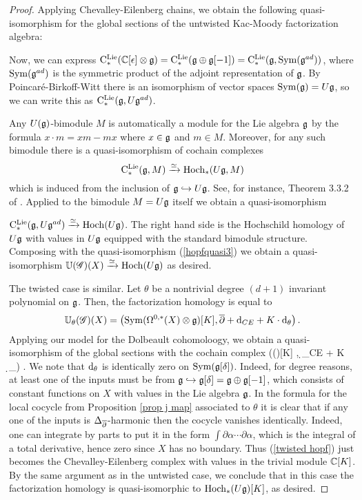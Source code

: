 \begin{proof}
Applying Chevalley-Eilenberg chains, we obtain the following quasi-isomorphism for the global sections of the untwisted Kac-Moody factorization algebra:
\beqn\label{hopfquasi3}
\eeqn
Now, we can express ${\rm C}^{\rm Lie}_*(\mathbb C[\epsilon] \otimes \mathfrak g) = {\rm C}^{\rm Lie}_*(\mathfrak g \oplus \mathfrak g[-1]) = {\rm C}^{\rm Lie}_*(\mathfrak g, {\rm Sym} (\mathfrak g^{ad}))$, where ${\rm Sym}(\mathfrak g^{ad})$ is the symmetric product of the adjoint representation of $\mathfrak g$. 
By Poincar\'{e}-Birkoff-Witt there is an isomorphism of vector spaces ${\rm Sym}(\mathfrak g) = U \mathfrak g$, so we can write this as ${\rm C}^{\rm Lie}_*(\mathfrak g, U \mathfrak g^{ad})$.

Any $U(\mathfrak g)$-bimodule $M$ is automatically a module for the Lie algebra $\mathfrak g$ by the formula $x \cdot m = xm - mx$ where $x \in \mathfrak g$ and $m \in M$.
Moreover, for any such bimodule there is a quasi-isomorphism of cochain complexes 
\[
{\rm C}^{\rm Lie}_*(\mathfrak g, M) \xrightarrow{\simeq} {\rm Hoch}_*(U\mathfrak g, M) 
\]
which is induced from the inclusion of $\mathfrak g \hookrightarrow U \mathfrak g$. 
See, for instance, Theorem 3.3.2 of \cite{LodayCyclic}.
Applied to the bimodule $M = U\mathfrak g$ itself we obtain a quasi-isomorphism 

\noindent${\rm C}^{\rm Lie}_*(\mathfrak g , U\mathfrak g^{ad}) \xrightarrow{\simeq} {\rm Hoch}(U\mathfrak g)$.
The right hand side is the Hochschild homology of $U\mathfrak g$ with values in $U\mathfrak g$ equipped with the standard bimodule structure. 
Composing with the quasi-isomorphism (\ref{hopfquasi3}) we obtain a quasi-isomorphism $\mathbb U(\mathscr G)(X) \xrightarrow{\simeq} {\rm Hoch}(U\mathfrak g)$ as desired.

The twisted case is similar. 
Let $\theta$ be a nontrivial degree $(d+1)$ invariant polynomial on $\mathfrak g$. 
Then, the factorization homology is equal to
\[
\mathbb U_\theta (\mathscr G)(X) = \left({\rm Sym}(\Omega^{0,*}(X) \otimes \mathfrak g)[K] , \overline{\partial} + {\rm d}_{CE} + K \cdot {\rm d}_\theta\right) .
\]
Applying our model for the Dolbeault cohomoloogy, we obtain a quasi-isomorphism of the global sections with the cochain complex
\beqn\label{twisted hopf}
\left(\Sym(\fg[\delta])[K] ,  \d_{CE} + K \cdot \d_\theta \right) .
\eeqn
We note that ${\rm d}_\theta$ is identically zero on ${\rm Sym}(\mathfrak g[\delta])$. 
Indeed, for degree reasons, at least one of the inputs must be from $\mathfrak g \hookrightarrow \mathfrak g[\delta] = \mathfrak g \oplus \mathfrak g[-1]$, which consists of constant functions on $X$ with values in the Lie algebra $\mathfrak g$. 
In the formula for the local cocycle from Proposition \ref{prop j map} associated to $\theta$ it is clear that if any one of the inputs is $\Delta_{\overline{\partial}}$-harmonic then the cocycle vanishes identically. 
Indeed, one can integrate by parts to put it in the form $\int \partial \alpha \cdots \partial \alpha$, which is the integral of a total derivative, hence zero since $X$ has no boundary.
Thus (\ref{twisted hopf}) just becomes the Chevalley-Eilenberg complex with values in the trivial module $\mathbb C[K]$. 
By the same argument as in the untwisted case, we conclude that in this case the factorization homology is quasi-isomorphic to ${\rm Hoch}_*(U \mathfrak g)[K]$, as desired.
\end{proof}

